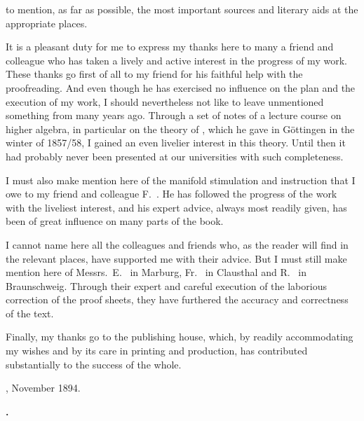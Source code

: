 
\noindent to mention, as far as possible, the most important sources and literary aids at the appropriate places.

It is a pleasant duty for me to express my thanks here to many a friend and colleague who has taken a lively and active interest in the progress of my work. These thanks go first of all to my friend  for his faithful help with the proofreading. And even though he has exercised no influence on the plan and the execution of my work, I should nevertheless not like to leave unmentioned something from many years ago. Through a set of notes of a lecture course on higher algebra, in particular on the theory of , which he gave in Göttingen in the winter of 1857/58, I gained an even livelier interest in this theory. Until then it had probably never been presented at our universities with such completeness.

I must also make mention here of the manifold stimulation and instruction that I owe to my friend and colleague F.~. He has followed the progress of the work with the liveliest interest, and his expert advice, always most readily given, has been of great influence on many parts of the book.

I cannot name here all the colleagues and friends who, as the reader will find in the relevant places, have supported me with their advice. But I must still make mention here of Messrs.\ E.~ in Marburg, Fr.~ in Clausthal and R.~ in Braunschweig. Through their expert and careful execution of the laborious correction of the proof sheets, they have furthered the accuracy and correctness of the text.

Finally, my thanks go to the publishing house, which, by readily accommodating my wishes and by its care in printing and production, has contributed substantially to the success of the whole.

\bigskip

, November 1894.

\medskip

\begin{flushright}
\textbf{.}
\end{flushright}
